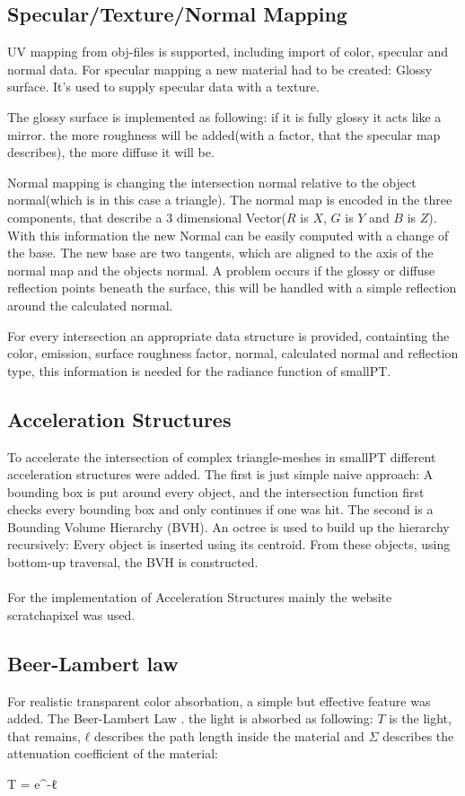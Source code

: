 \documentclass[11pt,a4paper]{article}
\begin{document}
\subsection{Specular/Texture/Normal Mapping}
UV mapping from obj-files is supported, including import of color, specular and normal data.
For specular mapping a new material had to be created: Glossy surface. It's used to supply specular data with a texture. 

The glossy surface is implemented as following: if it is fully glossy it acts like a mirror. the more roughness will be added(with a factor, that the specular map describes), the more diffuse it will be. 

Normal mapping is changing the intersection normal relative to the object normal(which is in this case a triangle). The normal map is encoded in the three components, that describe a 3 dimensional Vector($R$ is $X$, $G$ is $Y$ and $B$ is $Z$).
With this information the new Normal can be easily computed with a change of the base. The new base are two tangents, which are aligned to the axis of the normal map and the objects normal.
A problem occurs if the glossy or diffuse reflection points beneath the surface, this will be handled with a simple reflection around the calculated normal.

For every intersection an appropriate data structure is provided, containting the color, emission, surface roughness factor, normal, calculated normal and reflection type, this information is needed for the radiance function of smallPT.

\subsection{Acceleration Structures}
To accelerate the intersection of complex triangle-meshes in smallPT different acceleration structures were added.
The first is just simple naive approach: A bounding box is put around every object, and the intersection function first checks every bounding box and only continues if one was hit.
The second is a  Bounding Volume Hierarchy (BVH). An octree is used to build up the hierarchy recursively: Every object is inserted using its centroid. From these objects, using bottom-up traversal, the BVH is constructed.
\\
\\
For the implementation of Acceleration Structures mainly the website scratchapixel \cite{link:scratch}
was used.
\subsection{Beer-Lambert law}
For realistic transparent color absorbation, a simple but effective feature was added. The Beer-Lambert Law \cite{link:beerlambert} . the light is absorbed as following: $T$ is the light, that remains, $ℓ$ describes the path length inside the material and $\Sigma$ describes the attenuation coefficient of the material:
\begin{center}
T = e^{-ℓ \Sigma}
\end{center}
\end{document}
